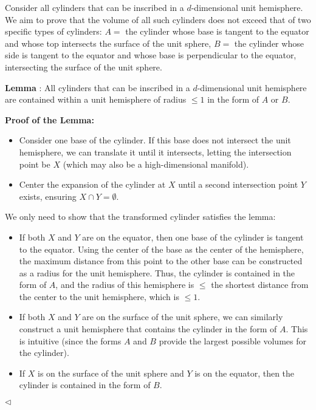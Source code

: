 \documentclass[11pt]{article}
\newenvironment{answer}[1][Answer]{\begin{trivlist}
\item[\hskip \labelsep {\bfseries #1.}\hskip \labelsep]}{\hfill$\lhd$\end{trivlist}}
\begin{document}
\begin{answer}

Consider all cylinders that can be inscribed in a $d$-dimensional unit hemisphere. We aim to prove that the volume of all such cylinders does not exceed that of two specific types of cylinders: 
$A=$ the cylinder whose base is tangent to the equator and whose top intersects the surface of the unit sphere, 
$B=$ the cylinder whose side is tangent to the equator and whose base is perpendicular to the equator, intersecting the surface of the unit sphere.

\textbf{Lemma} : All cylinders that can be inscribed in a $d$-dimensional unit hemisphere are contained within a unit hemisphere of radius $\leq 1$ in the form of $A$ or $B$.

\textbf{Proof of the Lemma:}
\begin{itemize}
    \item Consider one base of the cylinder. If this base does not intersect the unit hemisphere, we can translate it until it intersects, letting the intersection point be $X$ (which may also be a high-dimensional manifold).
    \item Center the expansion of the cylinder at $X$ until a second intersection point $Y$ exists, ensuring $X \cap Y = \emptyset$.
\end{itemize}
We only need to show that the transformed cylinder satisfies the lemma:
\begin{itemize}
    \item If both $X$ and $Y$ are on the equator, then one base of the cylinder is tangent to the equator. Using the center of the base as the center of the hemisphere, the maximum distance from this point to the other base can be constructed as a radius for the unit hemisphere. Thus, the cylinder is contained in the form of $A$, and the radius of this hemisphere is $\leq$ the shortest distance from the center to the unit hemisphere, which is $\leq 1$.
    
    \item If both $X$ and $Y$ are on the surface of the unit sphere, we can similarly construct a unit hemisphere that contains the cylinder in the form of $A$. This is intuitive (since the forms $A$ and $B$ provide the largest possible volumes for the cylinder).
    
    \item If $X$ is on the surface of the unit sphere and $Y$ is on the equator, then the cylinder is contained in the form of $B$.
\end{itemize}


\end{answer}
\end{document}
